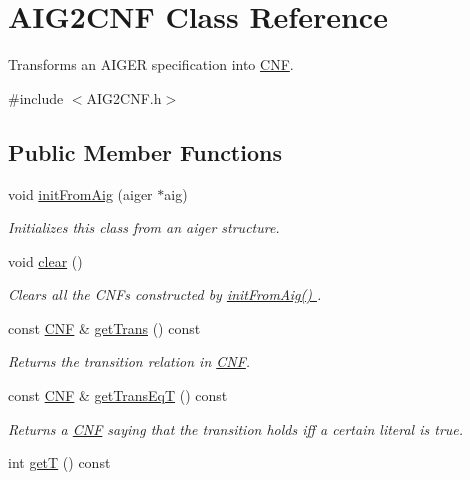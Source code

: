 \hypertarget{classAIG2CNF}{\section{A\-I\-G2\-C\-N\-F Class Reference}
\label{classAIG2CNF}
}


Transforms an A\-I\-G\-E\-R specification into \hyperlink{classCNF}{C\-N\-F}.  




{\ttfamily \#include $<$A\-I\-G2\-C\-N\-F.\-h$>$}

\subsection*{Public Member Functions}
\begin{DoxyCompactItemize}
\item 
void \hyperlink{classAIG2CNF_aa872708acbdc2bcb1bd23da9a1db2833}{init\-From\-Aig} (aiger $\ast$aig)
\begin{DoxyCompactList}\small\item\em Initializes this class from an aiger structure. \end{DoxyCompactList}\item 
void \hyperlink{classAIG2CNF_a4e3be4d76137eb30a6bed5885f709f29}{clear} ()
\begin{DoxyCompactList}\small\item\em Clears all the C\-N\-Fs constructed by \hyperlink{classAIG2CNF_aa872708acbdc2bcb1bd23da9a1db2833}{init\-From\-Aig() }. \end{DoxyCompactList}\item 
const \hyperlink{classCNF}{C\-N\-F} \& \hyperlink{classAIG2CNF_a02f56e622e210868ffafcdee4ad9fea2}{get\-Trans} () const 
\begin{DoxyCompactList}\small\item\em Returns the transition relation in \hyperlink{classCNF}{C\-N\-F}. \end{DoxyCompactList}\item 
const \hyperlink{classCNF}{C\-N\-F} \& \hyperlink{classAIG2CNF_add8899c00619a3c182e78d21b988d748}{get\-Trans\-Eq\-T} () const 
\begin{DoxyCompactList}\small\item\em Returns a \hyperlink{classCNF}{C\-N\-F} saying that the transition holds iff a certain literal is true. \end{DoxyCompactList}\item 
int \hyperlink{classAIG2CNF_a50f4e351f8d3f3f73b80e70849f00fe1}{get\-T} () const 

\end{DoxyCompactItemize}
